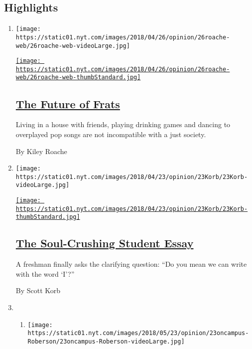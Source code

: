 \hypertarget{highlights}{%
\subsection{Highlights}\label{highlights}}

\begin{enumerate}
\def\labelenumi{\arabic{enumi}.}
\item
  \texttt{[image: https://static01.nyt.com/images/2018/04/26/opinion/26roache-web/26roache-web-videoLarge.jpg]}

  \href{/2018/04/26/opinion/frats-college-greek-life.html}{\texttt{[image: https://static01.nyt.com/images/2018/04/26/opinion/26roache-web/26roache-web-thumbStandard.jpg]}}

  \hypertarget{the-future-of-frats}{%
  \subsection{\texorpdfstring{\href{/2018/04/26/opinion/frats-college-greek-life.html}{The
  Future of Frats}}{The Future of Frats}}\label{the-future-of-frats}}

  Living in a house with friends, playing drinking games and dancing to
  overplayed pop songs are not incompatible with a just society.

  By Kiley Roache
\item
  \texttt{[image: https://static01.nyt.com/images/2018/04/23/opinion/23Korb/23Korb-videoLarge.jpg]}

  \href{/2018/04/21/opinion/the-soul-crushing-student-essay.html}{\texttt{[image: https://static01.nyt.com/images/2018/04/23/opinion/23Korb/23Korb-thumbStandard.jpg]}}

  \hypertarget{the-soul-crushing-student-essay}{%
  \subsection{\texorpdfstring{\href{/2018/04/21/opinion/the-soul-crushing-student-essay.html}{The
  Soul-Crushing Student
  Essay}}{The Soul-Crushing Student Essay}}\label{the-soul-crushing-student-essay}}

  A freshman finally asks the clarifying question: ``Do you mean we can
  write with the word `I'?''

  By Scott Korb
\item
  \begin{enumerate}
  \def\labelenumii{\arabic{enumii}.}
  \item
    \texttt{[image: https://static01.nyt.com/images/2018/05/23/opinion/23oncampus-Roberson/23oncampus-Roberson-videoLarge.jpg]}


\end{enumerate}
\end{enumerate}
